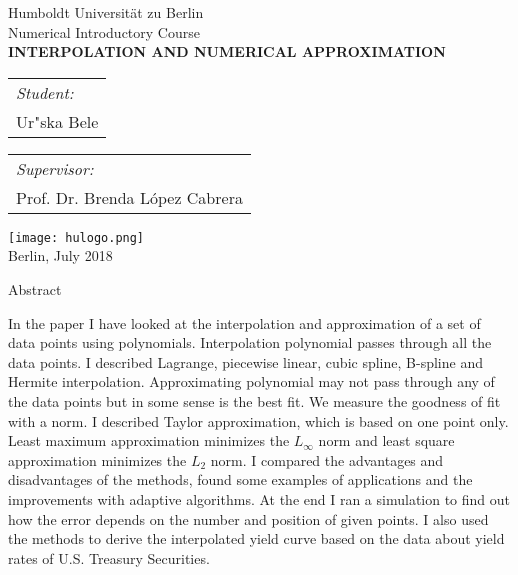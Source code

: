 \documentclass[a4paper,10pt]{article}
\begin{document}
\clearpage
\thispagestyle{empty}
\begin{center}
\large{Humboldt Universit{\"a}t zu Berlin} \\
\vspace{1cm}
\large{Numerical Introductory Course}\\
\vspace{5cm}
\Large{\textbf{INTERPOLATION AND NUMERICAL APPROXIMATION}}
\end{center}
\vspace{3cm}
\begin{tabular}[t]{@{}l} 
  {\textit{\large{Student:}}}\\ \large{Ur"ska Bele}
\end{tabular}
\hfill
\begin{tabular}[t]{l@{}}
   \large{\textit{Supervisor:}}\\ \large{Prof. Dr. Brenda L\'opez Cabrera}
\end{tabular}
\vspace{1.5cm}
\begin{center}
\texttt{[image: hulogo.png]}\\
\vspace{1cm}
Berlin, July 2018
\end{center}
\pagebreak

\thispagestyle{empty}
\tableofcontents
\pagebreak

\begin{center}
{\sc Abstract}

In the paper I have looked at the interpolation and approximation of a set of data
points using polynomials.
Interpolation polynomial passes through all the data points. I described Lagrange, piecewise linear, cubic spline, B-spline and Hermite interpolation.
Approximating polynomial may not pass through any of the data points but in some sense is the best fit. We measure the goodness of fit with a norm.
I described Taylor approximation, which is based on one point only. Least maximum approximation minimizes the $L_\infty$ norm and least square approximation minimizes the $L_2$ norm.
I compared the advantages and disadvantages of the methods, found some examples of applications and the improvements with adaptive algorithms.
At the end I ran a simulation to find out how the error depends on the number and position of given points. I also used the methods to derive the interpolated yield curve based on the data about yield rates of U.S. Treasury Securities.

\end{center}
\end{document}
